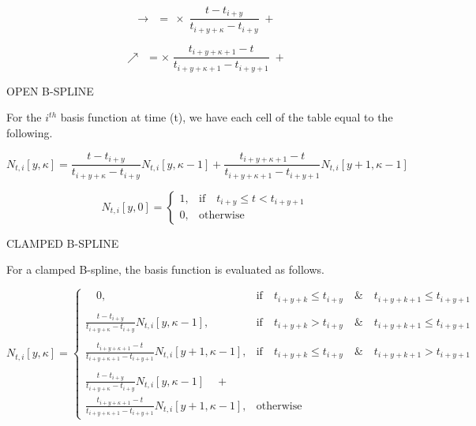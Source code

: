 \documentclass{article}
\begin{document}
\begin{equation} \label{right arrow}
    \rightarrow \:\: = \: \times \; \frac{t - t_{i+y}}{t_{i+y+\kappa} - t_{i+y}} \; + 
\end{equation}

\begin{equation} \label{diag arrow}
    \nearrow \:\:  = \times \; \frac{t_{i+y+\kappa+1} - t}{t_{i+y+\kappa+1}-t_{i+y+1}} \; + 
\end{equation}

\hspace{1cm}

OPEN B-SPLINE

\hspace{1cm}

For the \(i^{th}\) basis function at time (t), we have each cell of the table  equal to the following.

\begin{equation} \label{eq:table Basis function}
    N_{t,i}[y,\kappa] = \frac{t - t_{i+y}}{t_{i+y+\kappa} - t_{i+y}} N_{t,i}[y,\kappa-1] + \frac{t_{i+y+\kappa+1} - t}{t_{i+y+\kappa+1}-t_{i+y+1}} N_{t,i}[y+1,\kappa-1]
\end{equation}

\begin{equation} \label{eq:table Basis function equation zeros}
      N_{t,i}[y,0] =   \begin{cases} 1, &  \text{if} \quad t_{i+y} \leq t < t_{i+y+1} \\
                            0, & \text{otherwise} \end{cases}
  \end{equation}
  
\hspace{1cm}

CLAMPED B-SPLINE

\hspace{1cm}

For a clamped B-spline, the basis function is evaluated as follows.

\begin{equation} \label{eq:table evaluation clamped}
    N_{t,i}[y,\kappa] = \begin{cases} \quad 0, & \text{if} \quad t_{i+y+k} \leq t_{i+y} \quad \text{\&} \quad t_{i+y+k+1} \leq t_{i+y+1}\\\\
    \frac{t - t_{i+y}}{t_{i+y+\kappa} - t_{i+y}} N_{t,i}[y,\kappa-1], & \text{if} \quad t_{i+y+k} > t_{i+y} \quad \text{\&} \quad t_{i+y+k+1} \leq t_{i+y+1} \\\\
    \frac{t_{i+y+\kappa+1} - t}{t_{i+y+\kappa+1}-t_{i+y+1}} N_{t,i}[y+1,\kappa-1],  & \text{if} \quad t_{i+y+k} \leq t_{i+y} \quad \text{\&} \quad t_{i+y+k+1} > t_{i+y+1}\\\\
    \frac{t - t_{i+y}}{t_{i+y+\kappa} - t_{i+y}} N_{t,i}[y,\kappa-1] \quad + \\ \frac{t_{i+y+\kappa+1} - t}{t_{i+y+\kappa+1}-t_{i+y+1}} N_{t,i}[y+1,\kappa-1], & \text{otherwise}
    \end{cases}
\end{equation}
\end{document}
